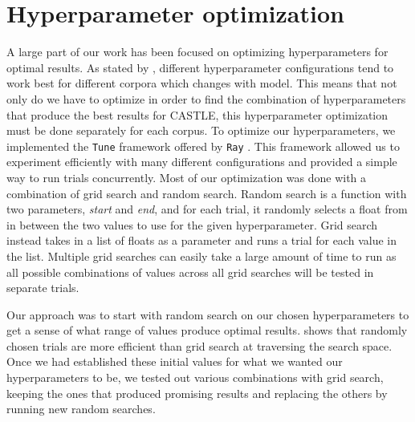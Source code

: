 \documentclass[nofilelist]{cslthse-msc}
\begin{document}
\section{Hyperparameter optimization}
\label{sect:hyper_opt}



A large part of our work has been focused on optimizing hyperparameters for optimal results. As stated by \citet{KOHAVI1995304}, different hyperparameter configurations tend to work best for different corpora which changes with model. This means that not only do we have to optimize in order to find the combination of hyperparameters that produce the best results for CASTLE, this hyperparameter optimization must be done separately for each corpus.
To optimize our hyperparameters, we implemented the \texttt{Tune} framework offered by \texttt{Ray} \citep{liaw2018tune}. This framework allowed us to experiment efficiently with many different configurations and provided a simple way to run trials concurrently. Most of our optimization was done with a combination of grid search and random search. Random search is a function with two parameters, \textit{start} and \textit{end}, and for each trial, it randomly selects a float from in between the two values to use for the given hyperparameter. Grid search instead takes in a list of floats as a parameter and runs a trial for each value in the list. Multiple grid searches can easily take a large amount of time to run as all possible combinations of values across all grid searches will be tested in separate trials. 

Our approach was to start with random search on our chosen hyperparameters to get a sense of what range of values produce optimal results. \citet{bergstra2012random} shows that randomly chosen trials are more efficient than grid search at traversing the search space. Once we had established these initial values for what we wanted our hyperparameters to be, we tested out various combinations with grid search, keeping the ones that produced promising results and replacing the others by running new random searches.







\end{document}
